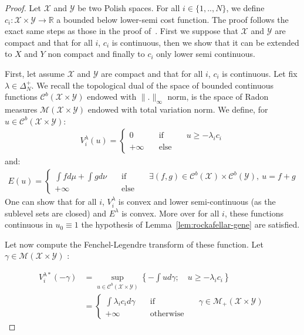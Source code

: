 \begin{proof}
Let $\mathcal{X}$ and $\mathcal{Y}$ be two Polish spaces. For all $i\in \{1,..,N\}$, we define $c_i:\mathcal{X}\times\mathcal{Y}\rightarrow \mathbb{R}$ a bounded below lower-semi cost function. The proof follows the exact same steps as those in the proof of~\citep[Theorem 1.3]{villani2003topics}. First we suppose that $\mathcal{X}$ and $\mathcal{Y}$ are compact and that for all $i$, $c_i$ is continuous, then we show that it can be extended to $X$ and $Y$ non compact and finally to $c_i$ only lower semi continuous.

\medskip
First, let assume $\mathcal{X}$ and $\mathcal{Y}$ are compact and that for all $i$, $c_i$ is continuous. Let fix $\lambda \in\Delta^+_N$. We recall the topological dual of the space of bounded continuous functions $\mathcal{C}^b(\mathcal{X}\times\mathcal{Y})$ endowed with $\lVert.\rVert_\infty$ norm, is the space of Radon measures $\mathcal{M}(\mathcal{X}\times\mathcal{Y})$ endowed with total variation norm. We define, for $u\in \mathcal{C}^b(\mathcal{X}\times\mathcal{Y})$:
\begin{align*}
V^\lambda_i(u) =
\left\{\begin{matrix} 0 &\quad\text{if}\quad& u\geq -\lambda_i c_i\\
+\infty &\quad\text{else}\quad&\end{matrix}\right.
\end{align*}
and:
\begin{align*}
E(u)=\left\{\begin{matrix} \int fd\mu+\int gd\nu &\quad\text{if}\quad& \exists (f,g)\in \mathcal{C}^b(\mathcal{X})\times \mathcal{C}^b(\mathcal{Y}),~ u = f+g\\
+\infty &\quad\text{else}\quad&\end{matrix}\right.
\end{align*}
One can show that for all $i$, $V^\lambda_i$ is convex and lower semi-continuous (as the sublevel sets are closed) and $E^\lambda$ is convex. More over for all $i$, these functions continuous in $u_0\equiv 1$ the hypothesis of Lemma~\ref{lem:rockafellar-gene} are satisfied.


Let now compute the Fenchel-Legendre transform of these function.  Let $\gamma\in \mathcal{M}(\mathcal{X}\times\mathcal{Y})$ :

\begin{align*}
V^{\lambda*}_i(-\gamma) &= \sup_{u\in \mathcal{C}^b(\mathcal{X}\times\mathcal{Y})}\left\{-\int ud\gamma;\quad u\geq-\lambda_i c_i\right\}
\\
& = \left\{\begin{matrix}\int \lambda_i c_i d\gamma &\quad\text{if} \quad& \gamma\in\mathcal{M}_+(\mathcal{X}\times\mathcal{Y}) \\
+\infty &\quad\text{otherwise}\quad& \end{matrix}\right.
\end{align*}


\end{proof}
